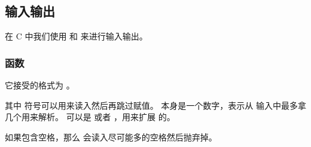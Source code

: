 \subsection{输入输出}
在 C 中我们使用  和  来进行输入输出。

\subsubsection{函数 \protect{}}
它接受的格式为 。

其中 \cmd{*} 符号可以用来读入然后再跳过赋值。 本身是一个数字，表示从
输入中最多拿几个用来解析。 可以是  或者 ，用来扩展
 的。

如果包含空格，那么  会读入尽可能多的空格然后抛弃掉。

